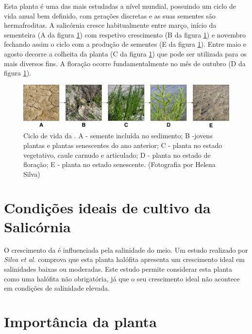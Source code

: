 Esta planta é uma das mais estudadas a nível mundial\cite{Figueroa1987}, possuindo um ciclo de vida anual bem definido, com gerações discretas e as suas sementes são hermafroditas\cite{Silva2007}. A salicórnia cresce habitualmente entre março, início da sementeira (A da figura \ref{ciclodevida}) com respetivo crescimento (B da figura \ref{ciclodevida}) e novembro fechando assim o ciclo com a produção de sementes (E da figura \ref{ciclodevida}). Entre maio  e agosto decorre a colheita da planta\cite{RaquelPinto} (C da figura \ref{ciclodevida}) que pode ser utilizada para os mais diversos fins. A floração ocorre fundamentalmente no mês de outubro\cite{Figueroa1987} (D da figura \ref{ciclodevida}). 



	
\begin{figure}[!htb]
	\centering
	\includegraphics[width=\linewidth]{img/cap2-sali/ciclo/ciclodevida.pdf}
	\caption{Ciclo de vida da \sr. A - semente incluída no sedimento; B -jovens plantas e plantas senescentes do ano anterior; C - planta no estado vegetativo, caule carnudo e articulado; D - planta no estado de floração; E - planta no estado senescente. (Fotografia por Helena Silva)}
	\label{ciclodevida}
\end{figure}



\section{Condições ideais de cultivo da Salicórnia}

O crescimento da \sr \space é influenciada pela salinidade do meio. Um estudo realizado por \textit{Silva et al.}\cite{Silva2007} comprova que esta planta halófita apresenta um crescimento ideal em salinidades baixas ou moderadas. Este estudo permite considerar esta planta como uma halófita não obrigatória, já que o seu crescimento ideal não acontece em condições de salinidade elevada.

\section{Importância da planta}


